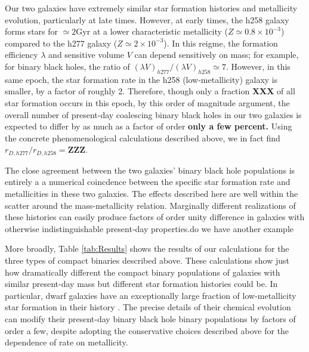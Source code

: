 \documentclass[nofootinbib,twocolumn,prd]{emulateapj}
\newcommand\editremark[1]{{\color{red}#1}}
\newcommand\unit[1]{\text{#1}}
\newcommand\ExcitingGalaxy{h258}
\newcommand\BoringGalaxy{h277}
\begin{document}
 Our two galaxies have extremely similar star formation histories and metallicity evolution, particularly at late
 times.  
However, at early times, the \ExcitingGalaxy{} galaxy forms stars for $\simeq 2\unit{Gyr}$ at a lower characteristic metallicity
($Z\simeq 0.8 \times10^{-3}$) compared
to the \BoringGalaxy{} galaxy ($Z\simeq 2\times 10^{-3}$).  In this reigme, the formation efficiency $\lambda$ and sensitive volume $V$
can depend sensitively on mass; for example, for binary black holes, the ratio of  $(\lambda V)_{\BoringGalaxy{}}/(\lambda
V)_{\ExcitingGalaxy{}} \simeq 7$.    However, in this same epoch, the star formation rate in the \ExcitingGalaxy{} (low-metallicity)
galaxy is smaller, by a factor of roughly 2.
Therefore, though only a fraction \textbf{XXX} of all star formation occurs in this epoch, by this order of magnitude
argument, the overall number of
present-day coalescing binary black holes in our two galaxies is expected to differ by as much as a factor of order \textbf{only
a few percent.}  
%
Using the concrete phenomenological calculations described above, we in fact find
$r_{D,\BoringGalaxy{}}/r_{D,\ExcitingGalaxy{}}=\textbf{ZZZ}$.    

The close agreement between the two galaxies' binary black hole populations  is entirely a
a numerical coincdence between the specific star formation rate and metallicities in these two galaxies.  The effects described here
  are well within the scatter around the mass-metallicity relation.  Marginally different realizations of these
  histories can easily produce factors of order unity difference in galaxies with otherwise indistinguishable
  present-day properties.\editremark{do we have another example}

More broadly, Table \ref{tab:Results} shows the results of our calculations for the three types of compact binaries
described above.   These calculations show just how dramatically different the compact binary populations of galaxies
with similar present-day mass but different star formation histories could be.   In particular, dwarf galaxies have an
exceptionally large fraction of low-metallicity star formation in their history \cite{Kirby13}.  The precise details of their chemical
evolution can modify their present-day binary black hole binary populations by factors of order a few, despite  adopting
the conservative choices described above for the dependence of rate on metallicity.  
\end{document}
